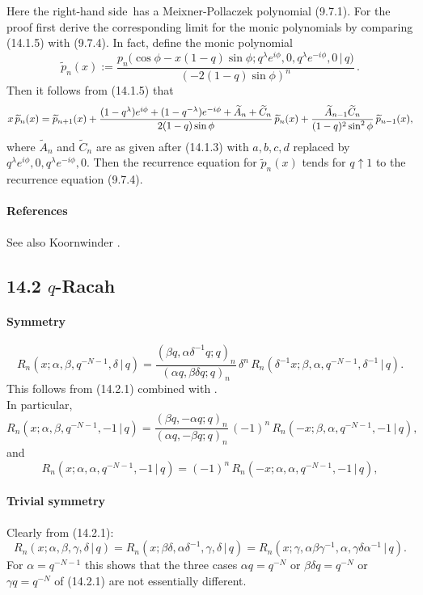 \documentclass[twoside,11pt]{article}
\newcommand\sa{\smallskipamount}
\newcommand\sLP{\\[\sa]}
\newcommand\al\alpha
\newcommand\be\beta
\newcommand\ga\gamma
\newcommand\de\delta
\newcommand\la\lambda
\newcommand\wt{\widetilde}
\newcommand\RHS{right-hand side}
\begin{document}
Here the \RHS\ has a Meixner-Pollaczek polynomial (9.7.1).
For the proof first derive the corresponding limit for the monic polynomials by comparing
(14.1.5) with (9.7.4).
In fact, define the monic polynomial
\[
\wt p_n(x):=
\frac{p_n\big(\cos\phi-x(1-q)\sin\phi;
q^\la e^{i\phi},0,q^\la e^{-i\phi},0\,|\, q\big)}{(-2(1-q)\sin\phi)^n}\,.
\]
Then it follows from (14.1.5) that
\begin{equation*}
x\,\wt p_n(x)=\wt p_{n+1}(x)
+\frac{(1-q^\la)e^{i\phi}+(1-q^{-\la})e^{-i\phi}+\wt A_n+\wt C_n}
{2(1-q)\sin\phi}\,\wt p_n(x)\\
+\frac{\wt A_{n-1} \wt C_n}{(1-q)^2 \sin^2\phi}\,\wt p_{n-1}(x),
\end{equation*}
where $\wt A_n$ and $\wt C_n$ are as given after (14.1.3) with $a,b,c,d$ replaced by
$q^\la e^{i\phi},0,q^\la e^{-i\phi},0$.
Then the recurrence equation for $\wt p_n(x)$ tends for $q\uparrow 1$ to
the recurrence equation (9.7.4).
%
\paragraph{References}
See also Koornwinder \cite{K7}.
%
\subsection*{14.2 $q$-Racah}
\label{sec14.2}
\paragraph{Symmetry}
\begin{equation}
R_n(x;\al,\be,q^{-N-1},\de\,|\, q)
=\frac{(\be q,\al\de^{-1}q;q)_n}{(\al q,\be\de q;q)_n}\,\de^n\,
R_n(\de^{-1}x;\be,\al,q^{-N-1},\de^{-1}\,|\, q).
\label{84}
\end{equation}
This follows from (14.2.1) combined with .
\sLP
In particular,
\begin{equation}
R_n(x;\al,\be,q^{-N-1},-1\,|\, q)
=\frac{(\be q,-\al q;q)_n}{(\al q,-\be q;q)_n}\,(-1)^n\,
R_n(-x;\be,\al,q^{-N-1},-1\,|\, q),
\label{85}
\end{equation}
and
\begin{equation}
R_n(x;\al,\al,q^{-N-1},-1\,|\, q)
=(-1)^n\,R_n(-x;\al,\al,q^{-N-1},-1\,|\, q),
\label{86}
\end{equation}

\paragraph{Trivial symmetry}
Clearly from (14.2.1):
\begin{equation}
R_n(x;\al,\be,\ga,\de\,|\, q)=R_n(x;\be\de,\al\de^{-1},\ga,\de\,|\, q)
=R_n(x;\ga,\al\be\ga^{-1},\al,\ga\de\al^{-1}\,|\, q).
\label{83}
\end{equation}
For $\al=q^{-N-1}$ this shows that the three cases
$\al q=q^{-N}$ or $\be\de q=q^{-N}$ or $\ga q=q^{-N}$ of (14.2.1)
are not essentially different.
%
\end{document}
